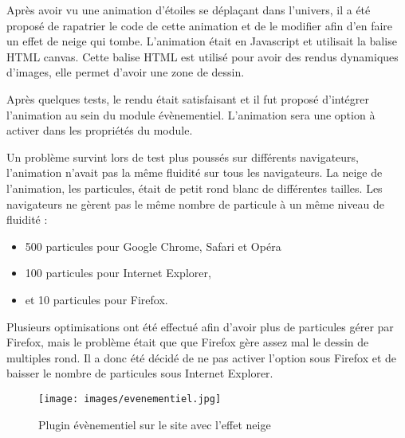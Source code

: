 \documentclass[12pt,a4paper]{article}
\begin{document}
\bigskip
Après avoir vu une animation d'étoiles se déplaçant dans l'univers, il a été proposé de rapatrier le code de cette animation et de le modifier afin d'en faire un effet de neige qui tombe. L'animation était en Javascript et utilisait la balise HTML canvas. Cette balise HTML est utilisé pour avoir des rendus dynamiques d'images, elle permet d'avoir une zone de dessin.\par 
Après quelques tests, le rendu était satisfaisant et il fut proposé d'intégrer l'animation au sein du module évènementiel. L'animation sera une option à activer dans les propriétés du module.\par 
Un problème survint lors de test plus poussés sur différents navigateurs, l'animation n'avait pas la même fluidité sur tous les navigateurs. La neige de l'animation, les particules, était de petit rond blanc de différentes tailles. Les navigateurs ne gèrent pas le même nombre de particule à un même niveau de fluidité :
\begin{itemize}
\item 500 particules pour Google Chrome, Safari et Opéra
\item 100 particules pour Internet Explorer,
\item et 10 particules pour Firefox.
\end{itemize}\par 
Plusieurs optimisations ont été effectué afin d'avoir plus de particules gérer par Firefox, mais le problème était que que Firefox gère assez mal le dessin de multiples rond. Il a donc été décidé de ne pas activer l'option sous Firefox et de baisser le nombre de particules sous Internet Explorer.\par 

\begin{figure}[h!]
\centering
\texttt{[image: images/evenementiel.jpg]}
\caption{Plugin évènementiel sur le site avec l'effet neige}
\end{figure}
\end{document}
